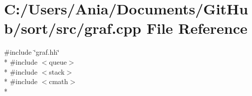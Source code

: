 \section{C\-:/\-Users/\-Ania/\-Documents/\-Git\-Hub/sort/src/graf.cpp File Reference}
\label{graf_8cpp}
{\ttfamily \#include \char`\"{}graf.\-hh\char`\"{}}\\*
{\ttfamily \#include $<$queue$>$}\\*
{\ttfamily \#include $<$stack$>$}\\*
{\ttfamily \#include $<$cmath$>$}\\*
